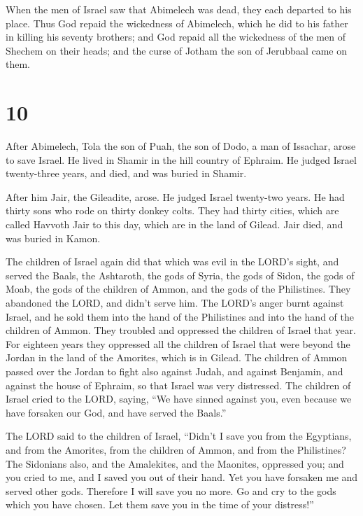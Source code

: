  When the men of Israel saw that Abimelech was dead, they
each departed to his place.  Thus God repaid the
wickedness of Abimelech, which he did to his father in killing his
seventy brothers;  and God repaid all the wickedness of
the men of Shechem on their heads; and the curse of Jotham the son of
Jerubbaal came on them.

\hypertarget{section-9}{%
\section{10}\label{section-9}}

 After Abimelech, Tola the son of Puah, the son of Dodo, a
man of Issachar, arose to save Israel. He lived in Shamir in the hill
country of Ephraim.  He judged Israel twenty-three years,
and died, and was buried in Shamir.

 After him Jair, the Gileadite, arose. He judged Israel
twenty-two years.  He had thirty sons who rode on thirty
donkey colts. They had thirty cities, which are called Havvoth Jair to
this day, which are in the land of Gilead.  Jair died, and
was buried in Kamon.

 The children of Israel again did that which was evil in
the LORD's sight, and served the Baals, the Ashtaroth, the gods of
Syria, the gods of Sidon, the gods of Moab, the gods of the children of
Ammon, and the gods of the Philistines. They abandoned the LORD, and
didn't serve him.  The LORD's anger burnt against Israel,
and he sold them into the hand of the Philistines and into the hand of
the children of Ammon.  They troubled and oppressed the
children of Israel that year. For eighteen years they oppressed all the
children of Israel that were beyond the Jordan in the land of the
Amorites, which is in Gilead.  The children of Ammon
passed over the Jordan to fight also against Judah, and against
Benjamin, and against the house of Ephraim, so that Israel was very
distressed.  The children of Israel cried to the LORD,
saying, ``We have sinned against you, even because we have forsaken our
God, and have served the Baals.''

 The LORD said to the children of Israel, ``Didn't I save
you from the Egyptians, and from the Amorites, from the children of
Ammon, and from the Philistines?  The Sidonians also, and
the Amalekites, and the Maonites, oppressed you; and you cried to me,
and I saved you out of their hand.  Yet you have forsaken
me and served other gods. Therefore I will save you no more.
 Go and cry to the gods which you have chosen. Let them
save you in the time of your distress!''

